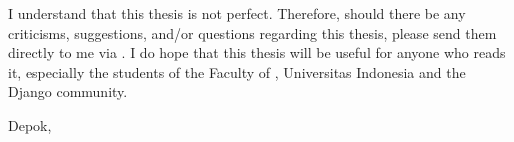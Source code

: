I understand that this thesis is not perfect. Therefore, should there be any
criticisms, suggestions, and/or questions regarding this thesis, please send
them directly to me via
. I do hope
that this thesis will be useful for anyone who reads it, especially the
students of the Faculty of \fakultas, Universitas Indonesia and the Django
community.

\vspace*{0.1cm}
\begin{flushright}
Depok, \tanggalSiapSidang\\[0.1cm]
\vspace*{1.5cm}
\penulis

\end{flushright}
